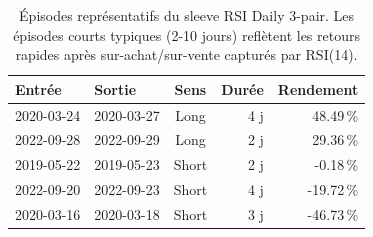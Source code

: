 \begin{table}[H]
\centering
\caption{Épisodes représentatifs du sleeve RSI Daily 3-pair. Les épisodes courts typiques (2-10 jours) reflètent les retours rapides après sur-achat/sur-vente capturés par RSI(14).}
\label{tab:trades_rsi_daily}
\begin{tabular}{llcrr}
\toprule
Entrée & Sortie & Sens & Durée & Rendement \\
\midrule
2020-03-24 & 2020-03-27 & Long & 4 j & 48.49\,\% \\
2022-09-28 & 2022-09-29 & Long & 2 j & 29.36\,\% \\
2019-05-22 & 2019-05-23 & Short & 2 j & -0.18\,\% \\
2022-09-20 & 2022-09-23 & Short & 4 j & -19.72\,\% \\
2020-03-16 & 2020-03-18 & Short & 3 j & -46.73\,\% \\
\bottomrule
\end{tabular}
\end{table}
